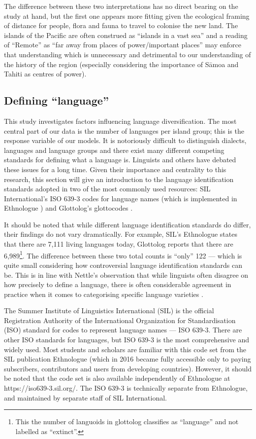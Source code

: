 \documentclass[12pt,letterpaper]{article}
\begin{document}
The difference between these two interpretations has no direct bearing on the study at hand, but the first one appears more fitting given the ecological framing of distance for people, flora and fauna to travel to colonise the new land. The islands of the Pacific are often construed as ``islands in a vast sea'' \citep{hauofa_1993} and a reading of ``Remote'' as ``far away from places of power/important places'' may enforce that understanding which is unnecessary and detrimental to our understanding of the history of the region (especially considering the importance of S\={a}moa and Tahiti as centres of power). 

\FloatBarrier
\subsection{Defining ``language''}
\label{appendix_sec:language_class}
This study investigates factors influencing language diversification. The most central part of our data is the number of languages per island group; this is the response variable of our models. It is notoriously difficult to distinguish dialects, languages and language groups and there exist many different competing standards for defining what a language is. Linguists and others have debated these issues for a long time. Given their importance and centrality to this research, this section will give an introduction to the language identification standards adopted in two of the most commonly used resources: SIL International's ISO 639-3 codes for language names (which is implemented in Ethnologue \citep{ethnologue22}) and Glottolog's glottocodes \citet{glottolog3}.

It should be noted that while different language identification standards do differ, their findings do not vary dramatically. For example, SIL's Ethnologue states that there are 7,111 living languages today, Glottolog reports that there are 6,989\footnote{This the number of languoids in glottolog classifies as ``language'' and not labelled as ``extinct''.}. The difference between these two total counts is ``only'' 122 --- which is quite small considering how controversial language identification standards can be. This is in line with Nettle's observation that while linguists often disagree on how precisely to define a language, there is often considerable agreement in practice when it comes to categorising specific language varieties \citep[356]{NETTLE1998}.

The Summer Institute of Linguistics International (SIL) is the official Registration Authority of the International Organization for Standardisation (ISO) standard for codes to represent language names --- ISO 639-3. There are other ISO standards for languages, but ISO 639-3 is the most comprehensive and widely used. Most students and scholars are familiar with this code set from the SIL publication Ethnologue (which in 2016 became fully accessible only to paying subscribers, contributors and users from developing countries). However, it should be noted that the code set is also available independently of Ethnologue at https://iso639-3.sil.org/. The ISO 639-3 is technically separate from Ethnologue, and maintained by separate staff of SIL International.
\end{document}
